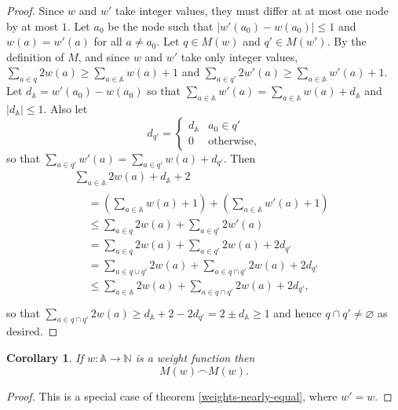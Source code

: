 \documentclass[journal]{IEEEtran}
\newtheorem{corollary}[theorem]{Corollary}
\begin{document}
\begin{proof}Since $w$ and $w'$ take integer values, they must differ at at
most one node by at most $1$. Let $a_0$ be the node such that $|w'(a_0) -
w(a_0)| \le 1$ and $w(a) = w'(a)$ for all $a \ne a_0$.
%
Let $q \in M(w)$ and $q' \in M(w')$. By the definition of $M$, and since $w$
and $w'$ take only integer values,
%
$\sum_{a \in q} 2 w(a) \ge \sum_{a \in \mathbb A} w(a) + 1$
%
and
%
$\sum_{a \in q'} 2 w'(a) \ge \sum_{a \in \mathbb A} w'(a) + 1$.
%
Let $d_{\mathbb A} = w'(a_0) - w(a_0)$ so that $\sum_{a \in \mathbb A} w'(a) =
\sum_{a \in \mathbb A} w(a) + d_{\mathbb A}$ and $|d_\mathbb A| \le 1$. Also
let \[ d_{q'} =
\begin{cases}
%
d_{\mathbb A} & a_0 \in q' \\
%
0 & \textrm{otherwise,}
%
\end{cases}
\]
so that $\sum_{a \in q'} w'(a) = \sum_{a \in q'} w(a) + d_{q'}$.
%
Then
\begin{gather*}
%
\sum_{a \in \mathbb A} 2w(a) + d_{\mathbb A} + 2 \\
%
\begin{aligned}
%
&= \left( \sum_{a \in \mathbb A} w(a)  + 1\right)
+  \left( \sum_{a \in \mathbb A} w'(a) + 1\right) \\
%
&\le \sum_{a \in q}  2w(a)
+    \sum_{a \in q'} 2w'(a) \\
%
&= \sum_{a \in q}  2w(a)
+  \sum_{a \in q'} 2w(a) + 2d_{q'}\\
%
&= \sum_{a \in q \cup q'} 2w(a)
+  \sum_{a \in q \cap q'} 2w(a) + 2d_{q'}\\
%
&\le \sum_{a \in \mathbb A} 2w(a)
+    \sum_{a \in q \cap q'} 2w(a) + 2d_{q'},\\
%
\end{aligned}\end{gather*} so that $\sum_{a \in q \cap q'} 2w(a) \ge d_{\mathbb
A} + 2 - 2d_{q'} = 2 \pm d_\mathbb A \ge 1$ and hence $q \cap q' \ne
\varnothing$ as desired.  \end{proof}

\begin{corollary} \label{weights-equal} If $w : \mathbb A \to \mathbb N$ is a
weight function then \[M(w) \frown M(w).\]  \end{corollary}

\begin{proof} This is a special case of theorem \ref{weights-nearly-equal},
where $w' = w$.  \end{proof}

\end{document}
